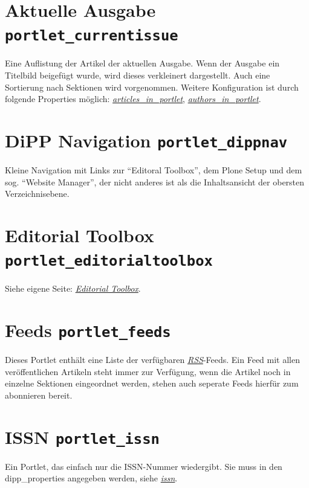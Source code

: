 \documentclass[a4paper,10pt,ngerman]{sphinxmanual}
\begin{document}
\section{Aktuelle Ausgabe \texttt{portlet\_currentissue}}
\label{portlets:portlet-currentissue}\label{portlets:aktuelle-ausgabe-portlet-currentissue}
Eine Auflistung der Artikel der aktuellen Ausgabe. Wenn der Ausgabe ein Titelbild
beigefügt wurde, wird dieses verkleinert dargestellt. Auch eine Sortierung nach
Sektionen wird vorgenommen. Weitere Konfiguration ist durch folgende Properties
möglich: {\hyperref[dipp_properties:prop-articles-in-portlet]{\emph{articles\_in\_portlet}}}, {\hyperref[dipp_properties:prop-authors-in-portlet]{\emph{authors\_in\_portlet}}}.


\section{DiPP Navigation \texttt{portlet\_dippnav}}
\label{portlets:dipp-navigation-portlet-dippnav}\label{portlets:portlet-dippnav}
Kleine Navigation mit Links zur ``Editoral Toolbox'', dem Plone Setup und dem
sog. ``Website Manager'', der nicht anderes ist als die Inhaltsansicht der
obersten Verzeichnisebene.


\section{Editorial Toolbox \texttt{portlet\_editorialtoolbox}}
\label{portlets:portlet-editorialtoolbox}\label{portlets:editorial-toolbox-portlet-editorialtoolbox}
Siehe eigene Seite: {\hyperref[editorial_toolbox:editorial-toolbox]{\emph{Editorial Toolbox}}}.


\section{Feeds \texttt{portlet\_feeds}}
\label{portlets:portlet-feeds}\label{portlets:feeds-portlet-feeds}
Dieses Portlet enthält eine Liste der verfügbaren {\hyperref[glossar:term-rss]{\emph{RSS}}}-Feeds. Ein Feed
mit allen veröffentlichen Artikeln steht immer zur Verfügung, wenn die Artikel
noch in einzelne Sektionen eingeordnet werden, stehen auch seperate Feeds hierfür
zum abonnieren bereit.


\section{ISSN \texttt{portlet\_issn}}
\label{portlets:issn-portlet-issn}\label{portlets:portlet-issn}
Ein Portlet, das einfach  nur die ISSN-Nummer wiedergibt. Sie muss in
den dipp\_properties angegeben werden, siehe {\hyperref[metadata_properties:prop-issn]{\emph{issn}}}.
\end{document}
